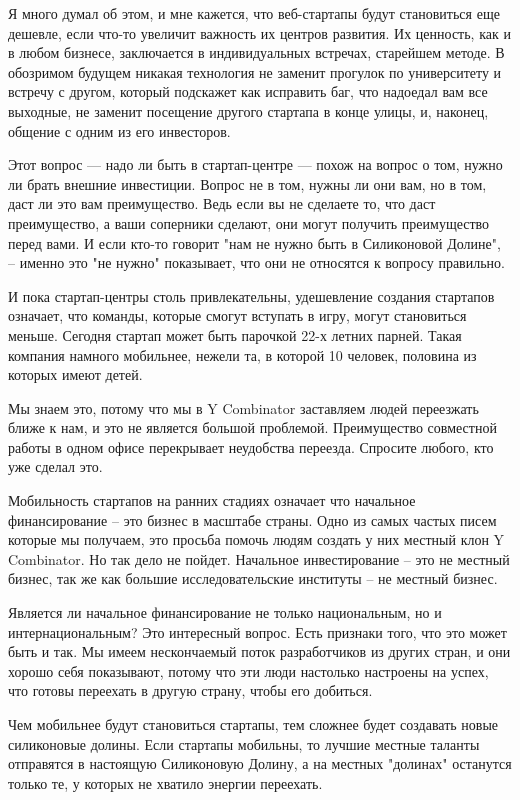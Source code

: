 \documentclass[ebook,12pt,oneside,openany]{memoir}
\begin{document}
Я много думал об этом, и мне кажется, что веб-стартапы будут
становиться еще дешевле, если что-то увеличит важность их центров
развития. Их ценность, как и в любом бизнесе, заключается в
индивидуальных встречах, старейшем методе. В обозримом будущем никакая
технология не заменит прогулок по университету и встречу с другом,
который подскажет как исправить баг, что надоедал вам все выходные, не
заменит посещение другого стартапа в конце улицы, и, наконец, общение
с одним из его инвесторов.

Этот вопрос — надо ли быть в стартап-центре — похож на вопрос о том,
нужно ли брать внешние инвестиции. Вопрос не в том, нужны ли они вам,
но в том, даст ли это вам преимущество. Ведь если вы не сделаете то,
что даст преимущество, а ваши соперники сделают, они могут получить
преимущество перед вами. И если кто-то говорит "нам не нужно быть в
Силиконовой Долине", -- именно это "не нужно" показывает, что они не
относятся к вопросу правильно.

И пока стартап-центры столь привлекательны, удешевление создания
стартапов означает, что команды, которые смогут вступать в игру, могут
становиться меньше. Сегодня стартап может быть парочкой 22-х летних
парней. Такая компания намного мобильнее, нежели та, в которой 10
человек, половина из которых имеют детей.

Мы знаем это, потому что мы в Y Combinator заставляем людей переезжать
ближе к нам, и это не является большой проблемой. Преимущество
совместной работы в одном офисе перекрывает неудобства переезда.
Спросите любого, кто уже сделал это.

Мобильность стартапов на ранних стадиях означает что начальное
финансирование -- это бизнес в масштабе страны. Одно из самых частых
писем которые мы получаем, это просьба помочь людям создать у них
местный клон Y Combinator. Но так дело не пойдет. Начальное
инвестирование -- это не местный бизнес, так же как большие
исследовательские институты -- не местный бизнес.

Является ли начальное финансирование не только национальным, но и
интернациональным? Это интересный вопрос. Есть признаки того, что это
может быть и так. Мы имеем нескончаемый поток разработчиков из других
стран, и они хорошо себя показывают, потому что эти люди настолько
настроены на успех, что готовы переехать в другую страну, чтобы его
добиться.

Чем мобильнее будут становиться стартапы, тем сложнее будет создавать
новые силиконовые долины. Если стартапы мобильны, то лучшие местные
таланты отправятся в настоящую Силиконовую Долину, а на местных
"долинах" останутся только те, у которых не хватило энергии переехать.
\end{document}
